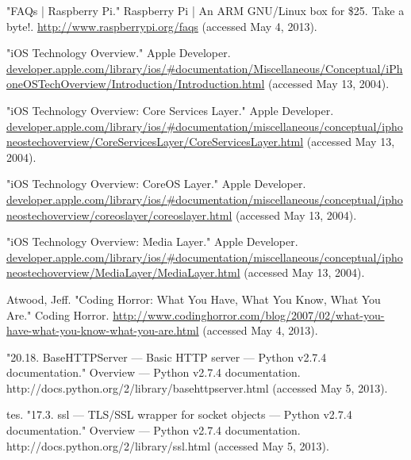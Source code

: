 \documentclass[10pt]{article}
\begin{document}
\begin{multicols}{2}
\begin{thebibliography}{99}
"FAQs  | Raspberry Pi." Raspberry Pi | An ARM GNU/Linux box for \$25. Take a byte!. \url{http://www.raspberrypi.org/faqs} (accessed May 4, 2013).

"iOS Technology Overview." Apple Developer. \url{developer.apple.com/library/ios/#documentation/Miscellaneous/Conceptual/iPhoneOSTechOverview/Introduction/Introduction.html} (accessed May 13, 2004).

"iOS Technology Overview: Core Services Layer." Apple Developer. \url{developer.apple.com/library/ios/#documentation/miscellaneous/conceptual/iphoneostechoverview/CoreServicesLayer/CoreServicesLayer.html} (accessed May 13, 2004).

"iOS Technology Overview: CoreOS Layer." Apple Developer. \url{developer.apple.com/library/ios/#documentation/miscellaneous/conceptual/iphoneostechoverview/coreoslayer/coreoslayer.html} (accessed May 13, 2004).

"iOS Technology Overview: Media Layer." Apple Developer. \url{developer.apple.com/library/ios/#documentation/miscellaneous/conceptual/iphoneostechoverview/MediaLayer/MediaLayer.html} (accessed May 13, 2004).

Atwood, Jeff. "Coding Horror: What You Have, What You Know, What You Are." Coding Horror. \url{http://www.codinghorror.com/blog/2007/02/what-you-have-what-you-know-what-you-are.html} (accessed May 4, 2013).

"20.18. BaseHTTPServer --- Basic HTTP server --- Python v2.7.4 documentation." Overview --- Python v2.7.4 documentation. http://docs.python.org/2/library/basehttpserver.html (accessed May 5, 2013).

tes. "17.3. ssl --- TLS/SSL wrapper for socket objects --- Python v2.7.4 documentation." Overview --- Python v2.7.4 documentation. http://docs.python.org/2/library/ssl.html (accessed May 5, 2013).



\end{thebibliography}


\end{multicols}
\end{document}
